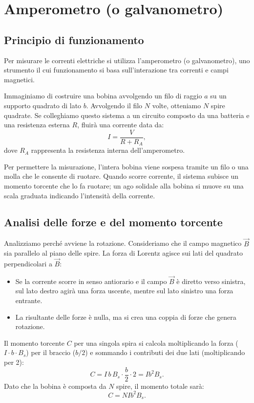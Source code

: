 \documentclass{book}
\begin{document}
\section{Amperometro (o galvanometro)}

\subsection*{Principio di funzionamento}
Per misurare le correnti elettriche si utilizza l'amperometro (o galvanometro), uno strumento il cui funzionamento si basa sull'interazione tra correnti e campi magnetici.

Immaginiamo di costruire una bobina avvolgendo un filo di raggio \(a\) su un supporto quadrato di lato \(b\). Avvolgendo il filo \(N\) volte, otteniamo \(N\) spire quadrate. Se colleghiamo questo sistema a un circuito composto da una batteria e una resistenza esterna \(R\), fluirà una corrente data da:
\[
I = \frac{V}{R+R_A},
\]
dove \(R_A\) rappresenta la resistenza interna dell'amperometro.

Per permettere la misurazione, l'intera bobina viene sospesa tramite un filo o una molla che le consente di ruotare. Quando scorre corrente, il sistema subisce un momento torcente che lo fa ruotare; un ago solidale alla bobina si muove su una scala graduata indicando l'intensità della corrente.

\subsection*{Analisi delle forze e del momento torcente}
Analizziamo perché avviene la rotazione. Consideriamo che il campo magnetico \(\vec{B}\) sia parallelo al piano delle spire. La forza di Lorentz agisce sui lati del quadrato perpendicolari a \(\vec{B}\):
\begin{itemize}
    \item Se la corrente scorre in senso antiorario e il campo \(\vec{B}\) è diretto verso sinistra, sul lato destro agirà una forza uscente, mentre sul lato sinistro una forza entrante.
    \item La risultante delle forze è nulla, ma si crea una coppia di forze che genera rotazione.
\end{itemize}

Il momento torcente \(C\) per una singola spira si calcola moltiplicando la forza (\(I \cdot b \cdot B_s\)) per il braccio (\(b/2\)) e sommando i contributi dei due lati (moltiplicando per 2):
\[
C = I\,b\,B_s\cdot\frac{b}{2}\cdot 2 = I b^2 B_s.
\]
Dato che la bobina è composta da \(N\) spire, il momento totale sarà:
\[
C = N I b^2 B_s.
\]
\end{document}
